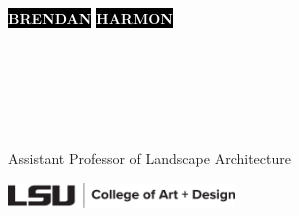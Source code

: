 \documentclass[10pt]{developercv} %
\begin{document}

\begin{minipage}[t]{0.45\textwidth} %
	\vspace{-\baselineskip} %
	\colorbox{black}{{\HUGE\textcolor{white}{\textbf{\MakeUppercase{Brendan}}}}} 
	\colorbox{black}{{\HUGE\textcolor{white}{\textbf{\MakeUppercase{Harmon }}}}} 
	
\end{minipage}
\begin{minipage}[t]{0.275\textwidth}
	\vspace{-\baselineskip} 
	\\
	\\
	
\end{minipage}
\begin{minipage}[t]{0.275\textwidth}
	\vspace{-\baselineskip}
	\\	
	\\
\end{minipage}

\vspace{16pt}

{\huge Assistant Professor of Landscape Architecture \par} 

\vspace{8pt}

\includegraphics[width=6cm]{images/lsu_art_design_logo.pdf}
\end{document}
